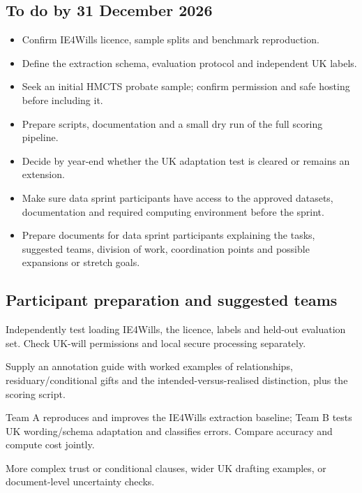\subsection{To do by 31 December 2026}
\begin{itemize}[nosep]
\item Confirm IE4Wills licence, sample splits and benchmark reproduction.
\item Define the extraction schema, evaluation protocol and independent UK labels.
\item Seek an initial HMCTS probate sample; confirm permission and safe hosting before including it.
\item Prepare scripts, documentation and a small dry run of the full scoring pipeline.
\item Decide by year-end whether the UK adaptation test is cleared or remains an extension.
\item Make sure data sprint participants have access to the approved datasets, documentation and required computing environment before the sprint.
\item Prepare documents for data sprint participants explaining the tasks, suggested teams, division of work, coordination points and possible expansions or stretch goals.
\end{itemize}

\subsection{Participant preparation and suggested teams}
\begin{description}[style=nextline]
\item[Access preflight] Independently test loading IE4Wills, the licence, labels and held-out evaluation set. Check UK-will permissions and local secure processing separately.
\item[Participant brief] Supply an annotation guide with worked examples of relationships, residuary/conditional gifts and the intended-versus-realised distinction, plus the scoring script.
\item[Suggested teams] Team A reproduces and improves the IE4Wills extraction baseline; Team B tests UK wording/schema adaptation and classifies errors. Compare accuracy and compute cost jointly.
\item[Stretch goals] More complex trust or conditional clauses, wider UK drafting examples, or document-level uncertainty checks.
\end{description}

